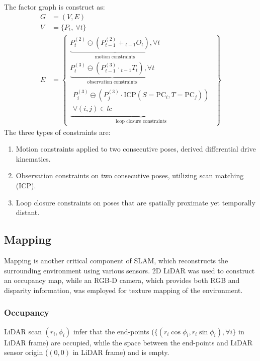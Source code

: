 \documentclass[conference]{IEEEtran}
\begin{document}
The factor graph is construct as:
$$
\begin{aligned}
G &= (V, E) \\
V &= \{ P_{t},\ \forall t\} \\
E &= \left\{ \begin{gathered}
\underbrace{P_{t}^{(2)} \ominus \left(P_{t-1}^{(2)} + {}_{t-1}O_{t} \right),\forall t}_{\text{motion constraints}} \\
\underbrace{P_{t}^{(3)} \ominus \left(P_{t-1}^{(3)} \cdot {}_{t-1}T_{t} \right),\forall t}_{\text{observation constraints}} \\
\underbrace{\begin{gathered} P_{i}^{(3)} \ominus \left(P_{j}^{(3)} \cdot \text{ICP}(S=\mathrm{PC}_{i}, T=\mathrm{PC}_{j}) \right) \\ \forall (i,j) \in lc \end{gathered}}_{\text{loop closure constraints}}
\end{gathered} \right\}
\end{aligned}
$$
The three types of constraints are:
\begin{enumerate}
\item Motion constraints applied to two consecutive poses, derived differential drive kinematics.
\item Observation constraints on two consecutive poses, utilizing scan matching (ICP).
\item Loop closure constraints on poses that are spatially proximate yet temporally distant.
\end{enumerate}


\subsection{Mapping}
Mapping is another critical component of SLAM, 
which reconstructs the surrounding environment using various sensors.
2D LiDAR was used to construct an occupancy map, 
while an RGB-D camera, which provides both RGB and disparity information,
was employed for texture mapping of the environment.

\subsubsection{Occupancy}
LiDAR scan $(r_i, \phi_i)$ infer that 
the end-points ($\{(r_i\cos\phi_i, r_i\sin\phi_i), \forall i\}$ in LiDAR frame) are occupied,
while the space between the end-points and LiDAR sensor origin 
($(0, 0)$ in LiDAR frame) and is empty.
\end{document}
